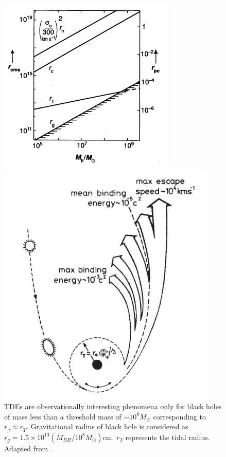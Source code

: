 \documentclass{tda}
\begin{document}
\begin{figure} [h]
	\centering
	\begin{minipage} {.45\textwidth}
		\centering
		\captionsetup{width=0.85\linewidth}
		\includegraphics[width=0.9\linewidth]{./images/rees1990.png}
		\caption{TDEs are observationally interesting phenomena only for black holes of mass less than a threshold mass of \(\sim 10^8 M_\odot\) corresponding to \(r^{}_g \approx r^{}_T\). Gravitational radius of black hole is considered as \(r^{}_g = 1.5 \times 10^{13} (M_{BH}/10^8 M_\odot)\)cm. \(r^{}_T\) represents the tidal radius. Adapted from \cite{rees_dead_1990}.}
		\label{fig:rees1990}
	\end{minipage}%
	\begin{minipage} {.45\textwidth}
		\centering
		\captionsetup{width=0.85\linewidth}
		\includegraphics[width=0.9\linewidth]{./images/rees1988.png}

\end{minipage}
\end{figure}
\end{document}
